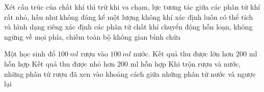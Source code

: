 \begin{ex}%
Xét cấu trúc của chất khí thì
{\True trừ khi va chạm, lực tương tác giữa các phân tử khí rất nhỏ, hầu như không đáng kể}
{một lượng không khí xác định luôn có thể tích và hình dạng riêng xác định}
{\True các phân tử chất khí chuyển động hỗn loạn, không ngừng về mọi phía, chiếm toàn bộ không gian bình chứa}
\end{ex}




\begin{ex}%
Một học sinh đổ $100\ ml$ rượu vào $100\ ml$ nước.
{Kết quả thu được lớn hơn 200 ml hỗn hợp}
{\True Kết quả thu được nhỏ hơn 200 ml hỗn hợp}
{\True Khi trộn rượu và nước, những phân tử rượu đã xen vào khoảng cách giữa những phân tử nước và ngược lại}

\end{ex}
%	
%		
%		

